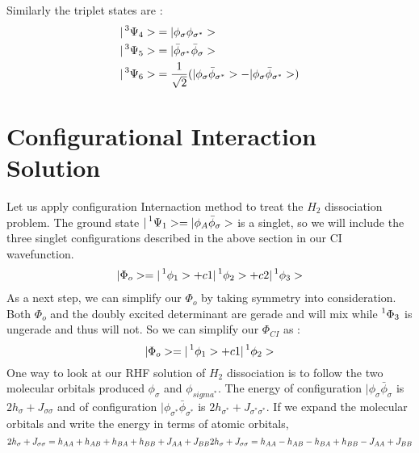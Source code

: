 \documentclass[11pt]{article}   	%
\begin{document}
	Similarly the triplet states are :\\
	\begin{equation}
	\begin{split}
		|\prescript{3}{}{\Psi_4}>&=|\phi_{\sigma}\phi_{\sigma^*}>\\
		|\prescript{3}{}{\Psi_5}>&=|\bar{\phi}_{\sigma^*}\bar{\phi}_{\sigma}>\\
		|\prescript{3}{}{\Psi_6}>&=\frac{1}{\sqrt{2}}(|\phi_{\sigma}\bar{\phi}_{\sigma^*}>-
		|\phi_{\sigma}\bar{\phi}_{\sigma^*}>)\\
	\end{split}
	\end{equation}
\section{Configurational Interaction Solution}
	Let us apply configuration Internaction method to treat the $H_2$ dissociation problem. The ground state 
	$|\prescript{1}{}{\Psi_1}>=|\phi_A\bar{\phi}_{\sigma}>$ is a singlet, so we will include the three singlet configurations 
	described in the above section in our CI wavefunction.\\
	\begin{equation}
	\begin{split}
		|\Phi_o>=|\prescript{1}{}{\phi_1}>+c1|\prescript{1}{}{\phi_2}>+c2|\prescript{1}{}{\phi_3}>
	\end{split}
	\end{equation}
	As a next step, we can simplify our $\Phi_o$ by taking symmetry into consideration. Both $\Phi_o$ and the doubly excited determinant are gerade and 
	will mix while $\prescript{1}{}{\Phi_3}$ is ungerade and thus will not. So we can simplify our $\Phi_{CI}$ as :\\
	\begin{equation}
		|\Phi_o>=|\prescript{1}{}{\phi_1}>+c1|\prescript{1}{}{\phi_2}>
	\end{equation}
	One way to look at our RHF solution of $H_2$ dissociation is to follow the two molecular orbitals produced $\phi_{\sigma}$ and $\phi_{sigma^*}$. 
	The energy of configuration $|\phi_{\sigma} \bar{\phi}_{\sigma}$ is $2h_{\sigma} +J_{\sigma \sigma}$ and of configuration 
	$|\phi_{\sigma^*} \bar{\phi}_{\sigma^*}$ is $2h_{\sigma^*} +J_{\sigma^* \sigma^*}$. If we expand the molecular orbitals and 
	write the energy in terms of atomic orbitals, \\
	\begin{equation}
	2h_{\sigma} +J_{\sigma \sigma}=h_{AA}+h_{AB}+h_{BA}+h_{BB}+J_{AA}+J_{BB}\\
	2h_{\sigma} +J_{\sigma \sigma}=h_{AA}-h_{AB}-h_{BA}+h_{BB}-J_{AA}+J_{BB}\\
	\end{equation}
\end{document}
